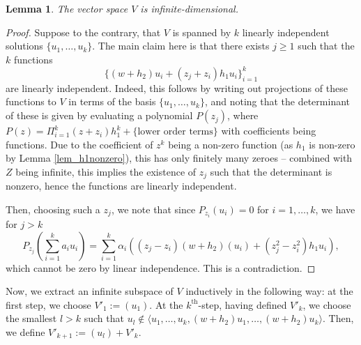 \documentclass[10pt, a4paper]{article}
\theoremstyle{plain}%
\newtheorem{lem}[theorem]{Lemma}
\theoremstyle{definition}
\numberwithin{figure}{section}
\numberwithin{equation}{section}
\newcommand{\la}{\langle}
\newcommand{\ra}{\rangle}
\begin{document}
\begin{lem}
	The vector space $V$ is infinite-dimensional.
\end{lem}
\begin{proof}
	
	
	Suppose to the contrary, that $V$ is spanned by $k$ linearly independent solutions $\{u_1,\dots,u_k\}$. The main claim here is that there exists $j \geq 1$ such that the $k$ functions\[
	\{(w+h_2)u_i+(z_j+z_i)h_1u_i\}_{i=1}^k
	\]
	are linearly independent. Indeed, this follows by writing out projections of these functions to $V$ in terms of the basis $\{u_1,\dots,u_k\}$, and noting that the determinant of these is given by evaluating a polynomial $P(z_j)$, where $P(z) = \Pi_{i=1}^k(z+z_i)h_1^k + \{\textrm{lower order terms}\}$ with coefficients being functions. Due to the coefficient of $z^k$ being a non-zero function (as $h_1$ is non-zero by Lemma \ref{lem_h1nonzero}), this has only finitely many zeroes -- combined with $Z$ being infinite, this implies the existence of $z_j$ such that the determinant is nonzero, hence the functions are linearly independent.
	
	Then, choosing such a $z_j$, we note that since $P_{z_i}(u_i)=0$ for $i=1,\dots,k$, we have for $j>k$ \[
	P_{z_j}\left(\sum_{i=1}^ka_iu_i\right) = \sum_{i=1}^k\alpha_i((z_j-z_i)(w+h_2)(u_i)+(z_j^2-z_i^2)h_1u_i), 
	\]
	which cannot be zero by linear independence. This is a contradiction.	 
\end{proof}
Now, we extract an infinite subspace of $V$ inductively in the following way: at the first step, we choose $V'_1:= (u_1)$. At the $k^\textrm{th}$-step, having defined $V'_k$, we choose the smallest $l>k$ such that $u_l \not\in \la u_1,\dots,u_k, (w+h_2)u_1,\dots,(w+h_2)u_k\ra$. Then, we define $V'_{k+1}:=(u_l)+V'_k$. 
\end{document}

